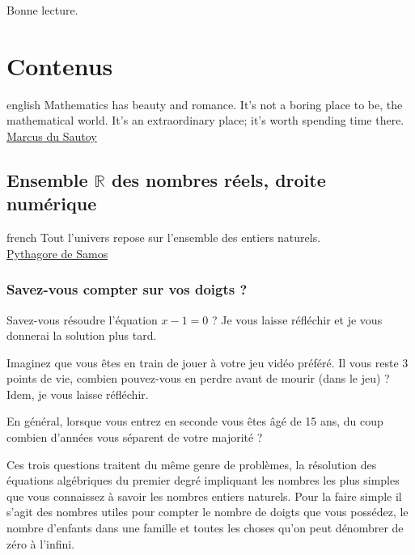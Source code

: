 \documentclass[a4paper, 11pt, twoside]{book}
\newcommand{\R}{\mathbb{R}}
\begin{document}
Bonne lecture.

\part{Contenus}
\label{sec:org4370264}
\startcontents[level-1]
\begin{foreigndisplayquote}{english}
Mathematics has beauty and romance. It’s not a boring place to be,
the mathematical world. It’s an extraordinary place; it’s worth
spending time there.\\

\href{https://en.wikipedia.org/wiki/Marcus\_du\_Sautoy}{Marcus du Sautoy}
\end{foreigndisplayquote}

\chapter{Ensemble \(\R\) des nombres réels, droite numérique}
\label{sec:org4798595}
\startcontents[level-2]

\begin{foreigndisplayquote}{french}
Tout l'univers repose sur l'ensemble des entiers naturels.\\
\href{https://fr.wikipedia.org/wiki/Pythagore}{Pythagore de Samos}
\end{foreigndisplayquote}


\section{Savez-vous compter sur vos doigts ?}
\label{sec:orge963e7c}

Savez-vous résoudre l'équation \(x - 1 = 0\) ? Je vous laisse
réfléchir et je vous donnerai la solution plus tard.

Imaginez que vous êtes en train de jouer à votre jeu vidéo
préféré. Il vous reste 3 points de vie, combien pouvez-vous en
perdre avant de mourir (dans le jeu) ? Idem, je vous laisse
réfléchir.

En général, lorsque vous entrez en seconde vous êtes âgé de 15 ans,
du coup combien d'années vous séparent de votre majorité ?

Ces trois questions traitent du même genre de problèmes, la
résolution des équations algébriques du premier degré impliquant
les nombres les plus simples que vous connaissez à savoir les
nombres entiers naturels. Pour la faire simple il s'agit des
nombres utiles pour compter le nombre de doigts que vous possédez,
le nombre d'enfants dans une famille et toutes les choses qu'on
peut dénombrer de zéro à l'infini.
\end{document}
